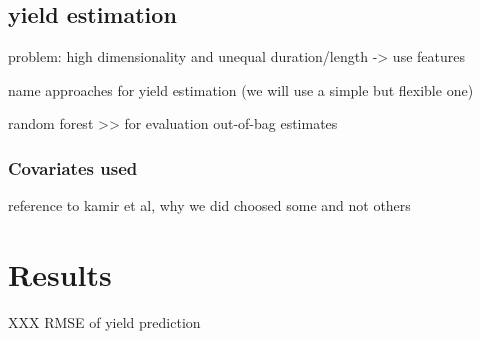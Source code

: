 \subsection{yield estimation}
problem: high dimensionality and unequal duration/length -> use features

name approaches for yield estimation (we will use a simple but flexible one)

random forest >> for evaluation out-of-bag estimates
\subsubsection{Covariates used}
reference to kamir et al, why we did choosed some and not others


\section{Results}
\begin{table}
	\begin{center}
		\caption{XXX RMSE of yield prediction}
		\small
		
		\normalsize
	\end{center}
\end{table}

\
